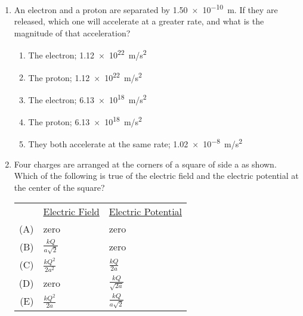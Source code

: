 \documentclass{../../../oss-apphys}
\begin{document}
\begin{multicols}{2}
\begin{enumerate}[leftmargin=18pt]
  \item An electron and a proton are separated by \SI{1.50e-10}{m}. If they are
    released, which one will accelerate at a greater rate, and what is the
    magnitude of that acceleration?
    \begin{enumerate}[noitemsep,topsep=0pt,leftmargin=18pt,label=(\Alph*)]
    \item The electron; \SI{1.12e22}{m/s^2}
    \item The proton; \SI{1.12e22}{m/s^2}
    \item The electron; \SI{6.13e18}{m/s^2}
    \item The proton; \SI{6.13e18}{m/s^2}
    \item They both accelerate at the same rate; \SI{1.02e-8}{m/s^2}
    \end{enumerate}

  \item Four charges are arranged at the corners of a square of side a as shown.
    Which of the following is true of the electric field and the electric
    potential at the center of the square?
    \begin{center}
    \end{center}
    \begin{tabular}{rll}
      & \underline{Electric Field} & \underline{Electric Potential}\\
      (A) & zero & zero \\
      (B) & $\frac{kQ}{a\sqrt{2}}$ & zero \\
      (C) & $\frac{kQ^2}{2a^2}$ &  $\frac{kQ}{2a}$\\
      (D) & zero &  $\frac{kQ}{\sqrt{2a}}$\\
      (E) & $\frac{kQ^2}{2a}$ & $\frac{kQ}{a\sqrt{2}}$
    \end{tabular}

    \columnbreak
    

\end{enumerate}
\end{multicols}
\end{document}
